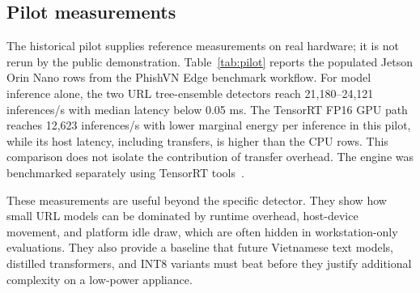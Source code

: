 \subsection{Pilot measurements}

The historical pilot supplies reference measurements on real hardware; it is not rerun by the public demonstration. Table~\ref{tab:pilot} reports the populated Jetson Orin Nano rows from the PhishVN Edge benchmark workflow. For model inference alone, the two URL tree-ensemble detectors reach 21,180--24,121 inferences/s with median latency below 0.05 ms. The TensorRT FP16 GPU path reaches 12,623 inferences/s with lower marginal energy per inference in this pilot, while its host latency, including transfers, is higher than the CPU rows. This comparison does not isolate the contribution of transfer overhead. The engine was benchmarked separately using TensorRT tools~\cite{nvidia_tensorrt}.



These measurements are useful beyond the specific detector. They show how small URL models can be dominated by runtime overhead, host-device movement, and platform idle draw, which are often hidden in workstation-only evaluations. They also provide a baseline that future Vietnamese text models, distilled transformers, and INT8 variants must beat before they justify additional complexity on a low-power appliance.
